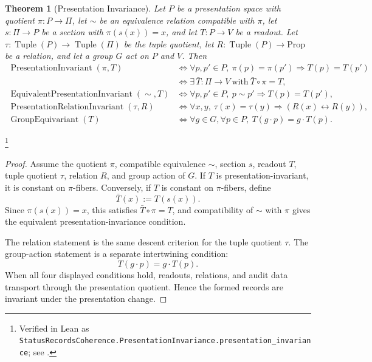 \documentclass[11pt]{article}
\newtheorem{theorem}{Theorem}[section]
\theoremstyle{definition}
\begin{document}
\begin{theorem}[Presentation Invariance]\label{thm:F29}
Let \(P\) be a presentation space with quotient
\(\pi:P\to\Pi\), let \(\sim\) be an equivalence relation compatible
with \(\pi\), let \(s:\Pi\to P\) be a section with
\(\pi(s(x))=x\), and let \(T:P\to V\) be a readout.  Let
\(\tau:\operatorname{Tuple}(P)\to\operatorname{Tuple}(\Pi)\) be the
tuple quotient, let \(R:\operatorname{Tuple}(P)\to\mathrm{Prop}\) be a
relation, and let a group \(G\) act on \(P\) and \(V\).  Then
\begin{align*}
  \operatorname{PresentationInvariant}(\pi,T)
  &\iff
  \forall p,p'\in P,\ \pi(p)=\pi(p')\Rightarrow T(p)=T(p')\\
  &\iff
  \exists\,\bar T:\Pi\to V\ \text{with}\ \bar T\circ\pi=T,\\
  \operatorname{EquivalentPresentationInvariant}(\sim,T)
  &\iff
  \forall p,p'\in P,\ p\sim p'\Rightarrow T(p)=T(p'),\\
  \operatorname{PresentationRelationInvariant}(\tau,R)
  &\iff
  \forall x,y,\ \tau(x)=\tau(y)\Rightarrow (R(x)\leftrightarrow R(y)),\\
  \operatorname{GroupEquivariant}(T)
  &\iff
  \forall g\in G,\forall p\in P,\ T(g\cdot p)=g\cdot T(p).
\end{align*}
\end{theorem}
\footnote{\raggedright Verified in Lean as
\texttt{StatusRecordsCoherence.PresentationInvariance.\allowbreak{}presentation\_invariance};
see .}
\begin{proof}
Assume the quotient \(\pi\), compatible equivalence \(\sim\), section
\(s\), readout \(T\), tuple quotient \(\tau\), relation \(R\), and
group action of \(G\).  If \(T\) is presentation-invariant, it is
constant on \(\pi\)-fibers.  Conversely, if \(T\) is constant on
\(\pi\)-fibers, define
\[
  \bar T(x):=T(s(x)).
\]
Since \(\pi(s(x))=x\), this satisfies \(\bar T\circ\pi=T\), and
compatibility of \(\sim\) with \(\pi\) gives the equivalent
presentation-invariance condition.

The relation statement is the same descent criterion for the tuple
quotient \(\tau\).  The group-action statement is a separate
intertwining condition:
\[
  T(g\cdot p)=g\cdot T(p).
\]
When all four displayed conditions hold, readouts, relations, and
audit data transport through the presentation quotient.  Hence the
formed records are invariant under the presentation change.
\end{proof}
\end{document}

